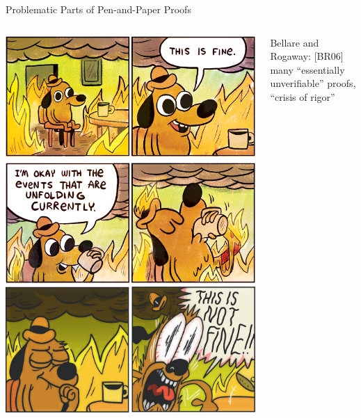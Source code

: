 \begin{frame}{Problematic Parts of Pen-and-Paper Proofs}
\hypertarget{problematic-proofs}{}
  \begin{columns}[fullwidth,c]
    \begin{column}{.3\linewidth}
      \includegraphics[width=\linewidth]{graphics/this-is-fine-crop.png}\\
      \includegraphics[width=\linewidth]{graphics/this-is-not-fine-crop.jpg}%
    \end{column}
    \hspace{1.2em}
    \begin{column}{.68\linewidth}

      Bellare and Rogaway: [BR06]\\
      \hspace{1.618em} many “essentially unverifiable” proofs, “crisis of rigor”\\[1.5em]


\end{column}
\end{columns}
\end{frame}
